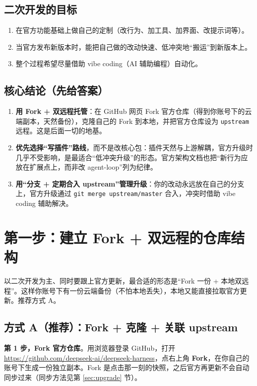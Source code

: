 \documentclass[11pt]{ctexart}
\newcommand{\code}[1]{\texttt{\small #1}}
\begin{document}
\subsection{二次开发的目标}

\begin{enumerate}[itemsep=1pt]
  \item 在官方功能基础上做自己的定制（改行为、加工具、加界面、改提示词等）。
  \item 当官方发布新版本时，能把自己做的改动快速、低冲突地“搬运”到新版本上。
  \item 整个过程希望尽量借助 vibe coding（AI 辅助编程）自动化。
\end{enumerate}

\subsection{核心结论（先给答案）}

\begin{enumerate}[itemsep=1pt]
  \item \textbf{用 Fork + 双远程托管}：在 GitHub 网页 Fork 官方仓库（得到你账号下的云端副本，天然备份），克隆自己的 Fork 到本地，并把官方仓库设为 \code{upstream} 远程。这是后面一切的地基。
  \item \textbf{优先选择“写插件”路线}，而不是改核心包：插件天然与上游解耦，官方升级时几乎不受影响，是最适合“低冲突升级”的形态。官方架构文档也把“新行为应放在扩展点上，而非改 agent-loop”列为纪律。
  \item \textbf{用“分支 + 定期合入 upstream”管理升级}：你的改动永远放在自己的分支上，官方升级通过 \code{git merge upstream/master} 合入，冲突时借助 vibe coding 辅助解决。
\end{enumerate}

\section{第一步：建立 Fork + 双远程的仓库结构}

以二次开发为主、同时要跟上官方更新，最合适的形态是“Fork 一份 + 本地双远程”。这样你账号下有一份云端备份（不怕本地丢失），本地又能直接拉取官方更新。推荐方式 A。

\subsection{方式 A（推荐）：Fork + 克隆 + 关联 upstream}

\textbf{第 1 步，Fork 官方仓库}。用浏览器登录 GitHub，打开 \url{https://github.com/deepseek-ai/deepseek-harness}，点右上角 \textbf{Fork}，在你自己的账号下生成一份独立副本。Fork 是点击那一刻的快照，之后官方再更新不会自动同步过来（同步方法见第 \ref{sec:upgrade} 节）。
\end{document}
